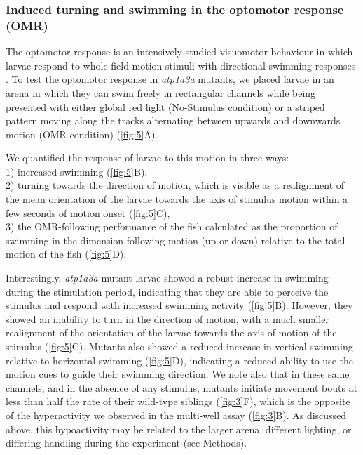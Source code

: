 \documentclass[9.5pt,lineno]{RandlettLab_elife}
\begin{document}
\subsubsection{Induced turning and swimming in the optomotor response (OMR)}
The optomotor response is an intensively studied visuomotor behaviour in which larvae respond to whole-field motion stimuli with directional swimming responses \citep{Portugues2009}. 
To test the optomotor response in \emph{atp1a3a} mutants, we placed larvae in an arena in which they can swim freely in rectangular channels while being presented with either global red light (No-Stimulus condition) or a striped pattern moving along the tracks alternating between upwards and downwards motion (OMR condition) (\autoref{fig:5}A). 

We quantified the response of larvae to this motion in three ways: 
\\1) increased swimming  (\autoref{fig:5}B), 
\\2) turning towards the direction of motion, which is visible as a realignment of the mean orientation of the larvae towards the axis of stimulus motion within a few seconds of motion onset (\autoref{fig:5}C),
\\3) the OMR-following performance of the fish calculated as the proportion of swimming in the dimension following motion (up or down) relative to the total motion of the fish (\autoref{fig:5}D).

Interestingly, \emph{atp1a3a} mutant larvae showed a robust increase in swimming during the stimulation period, indicating that they are able to perceive the stimulus and respond with increased swimming activity (\autoref{fig:5}B). 
However, they showed an inability to turn in the direction of motion, with a much smaller realignment of the orientation of the larvae towards the axis of motion of the stimulus (\autoref{fig:5}C). 
Mutants also showed a reduced increase in vertical swimming relative to horizontal swimming (\autoref{fig:5}D), indicating a reduced ability to use the motion cues to guide their swimming direction.
We note also that in these same channels, and in the absence of any stimulus, mutants initiate movement bouts at less than half the rate of their wild-type siblings (\autoref{fig:3}F), which is the opposite of the hyperactivity we observed in the multi-well assay (\autoref{fig:3}B). As discussed above, this hypoactivity may be related to the larger arena, different lighting, or differing handling during the experiment (see Methods).
\end{document}

